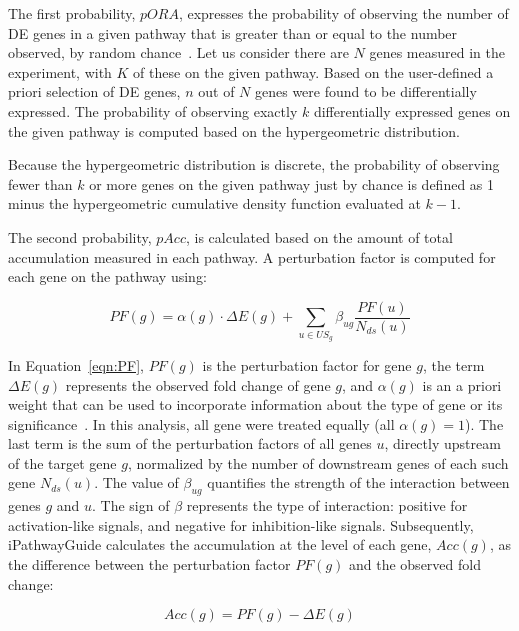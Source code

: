 The first probability, $pORA$, expresses the probability of observing the number of DE genes in a given pathway that is greater than or equal to the number observed, by random chance~\cite{DraghiciOE2:2003,DraghiciBook:2011}. Let us consider there are $N$ genes measured in the experiment, with $K$ of these on the given pathway. Based on the user-defined a priori selection of DE genes, $n$ out of $N$ genes were found to be differentially expressed. The probability of observing exactly $k$ differentially expressed genes on the given pathway is computed based on the hypergeometric distribution.

Because the hypergeometric distribution is discrete, the probability of observing fewer than $k$ or more genes on the given pathway just by chance is defined as 1 minus  the hypergeometric cumulative density function evaluated at $k-1$.


The second probability, $pAcc$, is calculated based on the amount of total accumulation measured in each pathway. A perturbation factor is computed for each gene on the pathway using:

\begin{equation}
\label{eqn:PF}
PF(g) = \alpha(g) \cdot \Delta E(g) + \sum_{u \in US_g} \beta_{ug}\frac{PF(u)}{N_{ds}(u)}
\end{equation}


In Equation~\ref{eqn:PF}, $PF(g)$ is the perturbation factor for gene $g$, the term $\Delta E(g)$ represents the observed fold change of gene $g$, and $\alpha(g)$ is an a priori weight that can be used to incorporate information about the type of gene or its significance~\cite{voichita2012incorporating}. In this analysis, all gene were treated equally (all $\alpha(g)=1$). The last term is the sum of the perturbation factors of all genes $u$, directly upstream of the target gene $g$, normalized by the number of downstream genes of each such gene $N_{ds}(u)$. The value of $\beta_{ug}$ quantifies the strength of the interaction between genes $g$ and $u$. The sign of $\beta$ represents the type of interaction: positive for activation-like signals, and negative for inhibition-like signals. Subsequently, iPathwayGuide calculates the accumulation at the level of each gene, $Acc(g)$, as the difference between the perturbation factor $PF(g)$ and the observed fold change:

\begin{equation}
Acc(g) = PF(g) - \Delta E(g)
\label{eqn:acc}
\end{equation}

